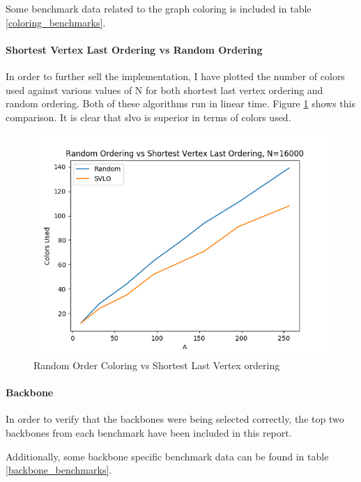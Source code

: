 \documentclass{article}
\begin{document}
    Some benchmark data related to the graph coloring is included in table \ref{coloring_benchmarks}.

    \paragraph{Shortest Vertex Last Ordering vs Random Ordering}
    In order to further sell the implementation, I have plotted the number of colors used against various values of N for both shortest last vertex ordering and random ordering.
    Both of these algorithms run in linear time.
    Figure \ref{random_coloring_vs_slvo} shows this comparison.
    It is clear that slvo is superior in terms of colors used.

    \begin{figure}
      \centering
      \label{random_coloring_vs_slvo}
      \includegraphics[width=1 \textwidth]{comparison/number_colors.png}
      \caption{Random Order Coloring vs Shortest Last Vertex ordering}
    \end{figure}

    \paragraph{Backbone}
    In order to verify that the backbones were being selected correctly, the top two backbones from each benchmark have been included in this report.

    Additionally, some backbone specific benchmark data can be found in table \ref{backbone_benchmarks}.
\end{document}
